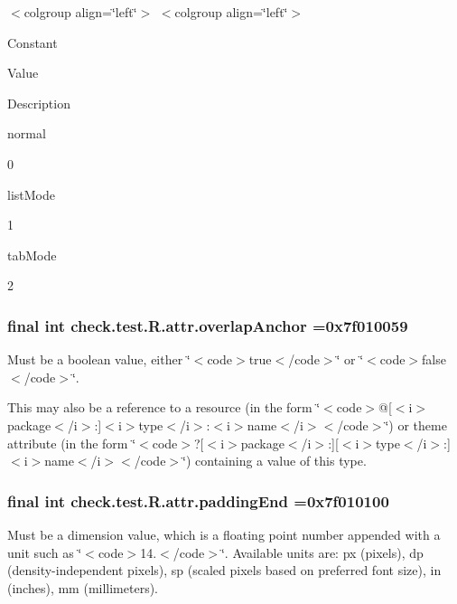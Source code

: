 \begin{TabularC}{0}
\hline
\end{TabularC}
$<$colgroup align=\char`\"{}left\char`\"{}$>$ $<$colgroup align=\char`\"{}left\char`\"{}$>$ 

Constant

Value

Description 

{\ttfamily normal}

0

{\ttfamily list\+Mode}

1

{\ttfamily tab\+Mode}

2\hypertarget{classcheck_1_1test_1_1_r_1_1attr_a0ff108aa79d1ca5503c46fa0b941870e}{}
\subsubsection[{overlap\+Anchor}]{\setlength{\rightskip}{0pt plus 5cm}final int check.\+test.\+R.\+attr.\+overlap\+Anchor =0x7f010059\hspace{0.3cm}{\ttfamily [static]}}\label{classcheck_1_1test_1_1_r_1_1attr_a0ff108aa79d1ca5503c46fa0b941870e}
Must be a boolean value, either \char`\"{}$<$code$>$true$<$/code$>$\char`\"{} or \char`\"{}$<$code$>$false$<$/code$>$\char`\"{}. 

This may also be a reference to a resource (in the form \char`\"{}$<$code$>$@\mbox{[}$<$i$>$package$<$/i$>$\+:\mbox{]}$<$i$>$type$<$/i$>$\+:$<$i$>$name$<$/i$>$$<$/code$>$\char`\"{}) or theme attribute (in the form \char`\"{}$<$code$>$?\mbox{[}$<$i$>$package$<$/i$>$\+:\mbox{]}\mbox{[}$<$i$>$type$<$/i$>$\+:\mbox{]}$<$i$>$name$<$/i$>$$<$/code$>$\char`\"{}) containing a value of this type. \hypertarget{classcheck_1_1test_1_1_r_1_1attr_a3817ccbc2ce29aa2aedb06d9517a49d0}{}
\subsubsection[{padding\+End}]{\setlength{\rightskip}{0pt plus 5cm}final int check.\+test.\+R.\+attr.\+padding\+End =0x7f010100\hspace{0.3cm}{\ttfamily [static]}}\label{classcheck_1_1test_1_1_r_1_1attr_a3817ccbc2ce29aa2aedb06d9517a49d0}
Must be a dimension value, which is a floating point number appended with a unit such as \char`\"{}$<$code$>$14.\+5sp$<$/code$>$\char`\"{}. Available units are\+: px (pixels), dp (density-\/independent pixels), sp (scaled pixels based on preferred font size), in (inches), mm (millimeters). 

